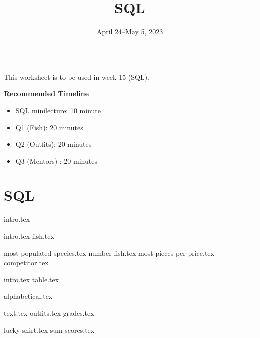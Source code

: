 \documentclass{exam}
\title{SQL}
\date{April 24--May 5, 2023}
\begin{document}
\maketitle\rule{\textwidth}{0.15em}

This worksheet is to be used in week 15 (SQL).

\begin{guide}

    \textbf{Recommended Timeline}
    \begin{itemize}
        \item SQL minilecture: 10 minute
        \item Q1 (Fish): 20 minutes
        \item Q2 (Outfits): 20 minutes
        \item Q3 (Mentors) : 20 minutes
    \end{itemize}
\end{guide}


\section{SQL}
{intro.tex}
\newpage
\begin{questions}
  \question 
  {intro.tex}
  {fish.tex}
  \begin{parts}
    {most-populated-species.tex}
    {number-fish.tex}
    {most-pieces-per-price.tex}
    {competitor.tex}
  \end{parts}

  \newpage
  \question
  {intro.tex}
  {table.tex}
  \begin{parts}
    {alphabetical.tex}
    {}
  \end{parts}

  \newpage
  \question
  {text.tex}
  {outfits.tex}
  {grades.tex}
  \begin{parts}
  {lucky-shirt.tex}
  {sum-scores.tex}
  \end{parts}
\end{questions}
\end{document}
